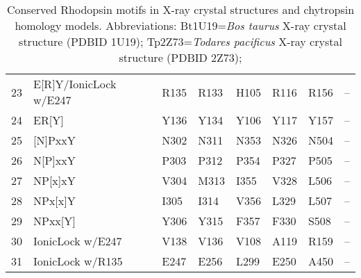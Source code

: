 \begin{table}[tbp]
\begin{tabular}{rlllllll}
  23 & E[R]Y/IonicLock w/E247 & R135 & R133 & H105 & R116 & R156 & -- \\ 
  24 & ER[Y] & Y136 & Y134 & Y106 & Y117 & Y157 & -- \\ 
   \hline
25 & [N]PxxY & N302 & N311 & N353 & N326 & N504 & -- \\ 
  26 & N[P]xxY & P303 & P312 & P354 & P327 & P505 & -- \\ 
  27 & NP[x]xY & V304 & M313 & I355 & V328 & L506 & -- \\ 
  28 & NPx[x]Y & I305 & I314 & V356 & L329 & L507 & -- \\ 
  29 & NPxx[Y] & Y306 & Y315 & F357 & F330 & S508 & -- \\ 
   \hline
30 & IonicLock w/E247 & V138 & V136 & V108 & A119 & R159 & -- \\ 
  31 & IonicLock w/R135 & E247 & E256 & L299 & E250 & A450 & -- \\ 
   \hline
\hline
\end{tabular}
\caption{Conserved Rhodopsin motifs in X-ray crystal structures and chytropsin homology models. Abbreviations: Bt1U19=\textit{Bos taurus} X-ray crystal structure (PDBID 1U19); Tp2Z73=\textit{Todares pacificus} X-ray crystal structure (PDBID 2Z73);} 
\label{tab:ChRhod_motifs}
\end{table}
